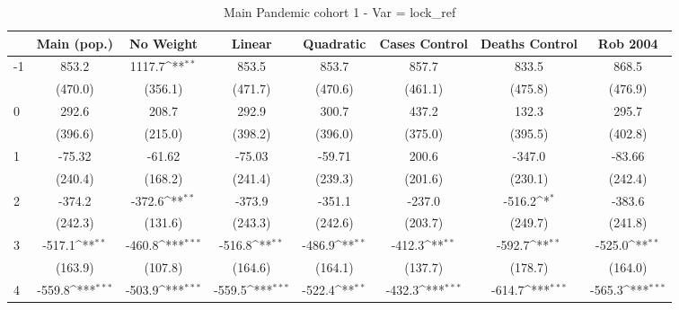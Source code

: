 \documentclass{article}
\begin{document}
{
\def\sym#1{\ifmmode^{#1}\else\(^{#1}\)\fi}
\begin{longtable}{l*{7}{c}}
\caption{Main Pandemic cohort 1 - Var = lock\_ref}\\
\hline\hline\endfirsthead\hline\endhead\hline\endfoot\endlastfoot
                &\multicolumn{1}{c}{Main (pop.)}&\multicolumn{1}{c}{No Weight}&\multicolumn{1}{c}{Linear}&\multicolumn{1}{c}{Quadratic}&\multicolumn{1}{c}{Cases Control}&\multicolumn{1}{c}{Deaths Control}&\multicolumn{1}{c}{Rob 2004}\\
\hline
-1              &    853.2         &   1117.7\sym{**} &    853.5         &    853.7         &    857.7         &    833.5         &    868.5         \\
                &  (470.0)         &  (356.1)         &  (471.7)         &  (470.6)         &  (461.1)         &  (475.8)         &  (476.9)         \\
0               &    292.6         &    208.7         &    292.9         &    300.7         &    437.2         &    132.3         &    295.7         \\
                &  (396.6)         &  (215.0)         &  (398.2)         &  (396.0)         &  (375.0)         &  (395.5)         &  (402.8)         \\
1               &   -75.32         &   -61.62         &   -75.03         &   -59.71         &    200.6         &   -347.0         &   -83.66         \\
                &  (240.4)         &  (168.2)         &  (241.4)         &  (239.3)         &  (201.6)         &  (230.1)         &  (242.4)         \\
2               &   -374.2         &   -372.6\sym{**} &   -373.9         &   -351.1         &   -237.0         &   -516.2\sym{*}  &   -383.6         \\
                &  (242.3)         &  (131.6)         &  (243.3)         &  (242.6)         &  (203.7)         &  (249.7)         &  (241.8)         \\
3               &   -517.1\sym{**} &   -460.8\sym{***}&   -516.8\sym{**} &   -486.9\sym{**} &   -412.3\sym{**} &   -592.7\sym{**} &   -525.0\sym{**} \\
                &  (163.9)         &  (107.8)         &  (164.6)         &  (164.1)         &  (137.7)         &  (178.7)         &  (164.0)         \\
4               &   -559.8\sym{***}&   -503.9\sym{***}&   -559.5\sym{***}&   -522.4\sym{**} &   -432.3\sym{***}&   -614.7\sym{***}&   -565.3\sym{***}\\

\end{longtable}}
\end{document}
